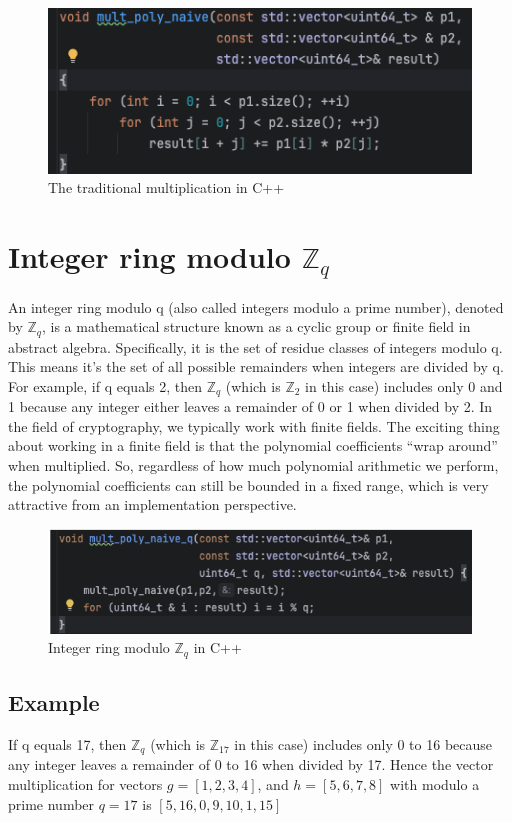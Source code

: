 \documentclass{techrep}
\theoremstyle{definition}
\theoremstyle{plain}
\newcommand{\Z}{\mathbb{Z}}
\begin{document}
	\begin{figure}[H]
		\centering
		\includegraphics[width=.8\columnwidth]{fig/naive_poly_mult.png}
		\caption{The traditional multiplication in C++}
		\label{fig:naive_poly_mult}
	\end{figure}


	\section{Integer ring modulo $\Z_{q}$}
	An integer ring modulo q (also called integers modulo a prime number), denoted by $\Z_{q}$, is a mathematical structure known as a cyclic group or finite field in abstract algebra. Specifically, it is the set of residue classes of integers modulo q. This means it's the set of all possible remainders when integers are divided by q.
	For example, if q equals 2, then $\Z_{q}$ (which is $\Z_{2}$ in this case) includes only 0 and 1 because any integer either leaves a remainder of 0 or 1 when divided by 2. In the field of cryptography, we typically work with finite fields. The exciting thing about working in a finite field is that the polynomial coefficients “wrap around” when multiplied. So, regardless of how much polynomial arithmetic we perform, the polynomial coefficients can still be bounded in a fixed range, which is very attractive from an implementation perspective.

	\begin{figure}[H]
		\centering
		\includegraphics[width=.9\columnwidth]{fig/Zq_Cplus.png}
		\caption{Integer ring modulo $\Z_{q}$ in C++}
		\label{fig:Zq_Cplus}
	\end{figure}


	\subsection{Example}
	If q equals 17, then $\Z_{q}$ (which is $\Z_{17}$ in this case) includes only 0 to 16 because any integer leaves a remainder of 0 to 16 when divided by 17. Hence the vector multiplication for vectors $g = [1, 2, 3, 4]$, and $h = [5, 6, 7, 8]$ with modulo a prime number $q = 17$ is  $[5, 16, 0, 9, 10, 1, 15]$
\end{document}
